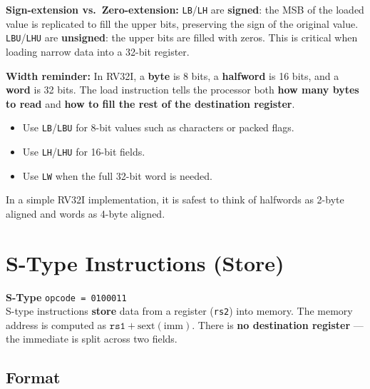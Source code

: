 \documentclass[12pt, a4paper, oneside]{book}
\begin{document}
\begin{infobox}
\textbf{\color{accentblue}Sign-extension vs.\ Zero-extension:}
\texttt{LB}/\texttt{LH} are \textbf{signed}: the MSB of the loaded value is replicated to fill the upper bits, preserving the sign of the original value. \texttt{LBU}/\texttt{LHU} are \textbf{unsigned}: the upper bits are filled with zeros. This is critical when loading narrow data into a 32-bit register.
\end{infobox}

\begin{keybox}
\textbf{\color{gold}Width reminder:}
In RV32I, a \textbf{byte} is 8 bits, a \textbf{halfword} is 16 bits, and a \textbf{word} is 32 bits. The load instruction tells the processor both \textbf{how many bytes to read} and \textbf{how to fill the rest of the destination register}.

\begin{itemize}
  \item Use \texttt{LB}/\texttt{LBU} for 8-bit values such as characters or packed flags.
  \item Use \texttt{LH}/\texttt{LHU} for 16-bit fields.
  \item Use \texttt{LW} when the full 32-bit word is needed.
\end{itemize}

In a simple RV32I implementation, it is safest to think of halfwords as 2-byte aligned and words as 4-byte aligned.
\end{keybox}

\newpage

\section{S-Type Instructions (Store)}

\begin{infobox}
\textbf{\color{stypecolor}\Large S-Type} \hfill \texttt{opcode = 0100011}\\[6pt]
S-type instructions \textbf{store} data from a register (\texttt{rs2}) into memory. The memory address is computed as $\texttt{rs1} + \text{sext}(\text{imm})$. There is \textbf{no destination register} --- the immediate is split across two fields.
\end{infobox}

\subsection{Format}
\end{document}
